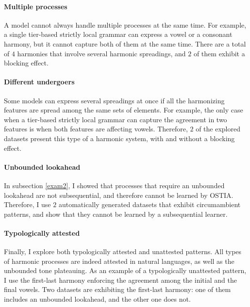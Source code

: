 \paragraph{Multiple processes}
A model cannot always handle multiple processes at the same time.
For example, a single tier-based strictly local grammar can express a vowel or a consonant harmony, but it cannot capture both of them at the same time.
There are a total of $4$ harmonies that involve several harmonic spreadings, and $2$ of them exhibit a blocking effect.


\paragraph{Different undergoers}
Some models can express several spreadings at once if all the harmonizing features are spread among the same sets of elements.
For example, the only case when a tier-based strictly local grammar can capture the agreement in two features is when both features are affecting vowels.
Therefore, $2$ of the explored datasets present this type of a harmonic system, with and without a blocking effect.

\paragraph{Unbounded lookahead}
In subsection \ref{exam2}, I showed that processes that require an unbounded lookahead are not subsequential, and therefore cannot be learned by OSTIA.
Therefore, I use $2$ automatically generated datasets that exhibit circumambient patterns, and show that they cannot be learned by a subsequential learner.

\paragraph{Typologically attested}
Finally, I explore both typologically attested and unattested patterns.
All types of harmonic processes are indeed attested in natural languages, as well as the unbounded tone plateauing.
As an example of a typologically unattested pattern, I use the first-last harmony enforcing the agreement among the initial and the final vowels.
Two datasets are exhibiting the first-last harmony: one of them includes an unbounded lookahead, and the other one does not.


